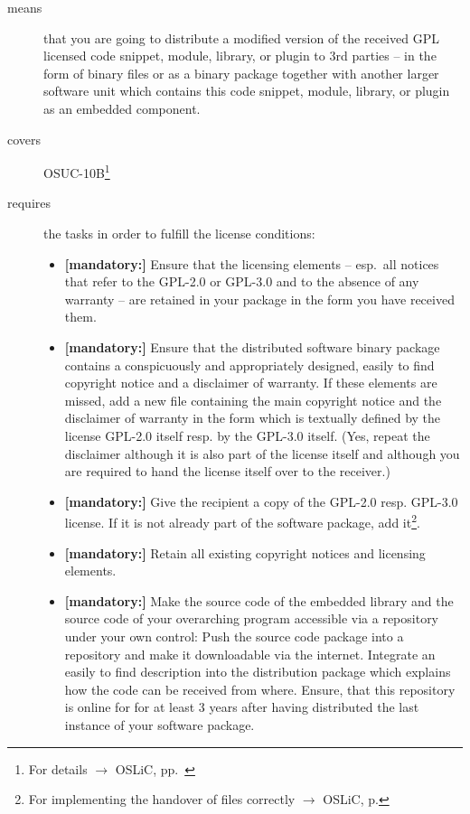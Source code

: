 \begin{description}
\item[means] that you are going to distribute a modified version of the received
GPL licensed code snippet, module, library, or plugin to 3rd parties -- in the
form of binary files or as a binary package together with another larger
software unit which contains this code snippet, module, library, or plugin as an
embedded component.
\item[covers] OSUC-10B\footnote{For details $\rightarrow$ OSLiC, pp.\
\pageref{OSUC-10B-DEF}}
\item[requires] the tasks in order to fulfill the license conditions:
\begin{itemize}
  

  \item \textbf{[mandatory:]} Ensure that the licensing elements -- esp.\ all
  notices that refer to the GPL-2.0 or GPL-3.0 and to the absence of any
  warranty -- are retained in your package in the form you have received them.

  \item \textbf{[mandatory:]} Ensure that the distributed software binary
  package contains a conspicuously and appropriately designed, easily to find
  copyright notice and a disclaimer of warranty. If these elements are missed,
  add a new file containing the main copyright notice and the disclaimer of
  warranty in the form which is textually defined by the license GPL-2.0 itself
  resp. by the GPL-3.0 itself. (Yes, repeat the disclaimer although it is also
  part of the license itself and although you are required to hand the license
  itself over to the receiver.)
  
  \item \textbf{[mandatory:]} Give the recipient a copy of the GPL-2.0 resp.
  GPL-3.0 license. If it is not already part of the software package, add
  it\footnote{For implementing the handover of files correctly $\rightarrow$
  OSLiC, p. \pageref{DistributingFilesHint}}.
  
  \item \textbf{[mandatory:]} Retain all existing copyright notices and
  licensing elements.

  \item \textbf{[mandatory:]} Make the source code of the embedded library and
  the source code of your overarching program accessible via a repository under
  your own control: Push the source code package into a repository and make it
  downloadable via the internet. Integrate an easily to find description into
  the distribution package which explains how the code can be received from
  where. Ensure, that this repository is online for for at least 3 years after
  having distributed the last instance of your software package.


\end{itemize}
\end{description}
